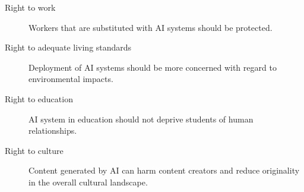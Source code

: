 \begin{description}
    \item[Right to work]
        Workers that are substituted with AI systems should be protected.

    \item[Right to adequate living standards]
        Deployment of AI systems should be more concerned with regard to environmental impacts.

    \item[Right to education]
        AI system in education should not deprive students of human relationships.

    \item[Right to culture]
        Content generated by AI can harm content creators and reduce originality in the overall cultural landscape.
\end{description}
